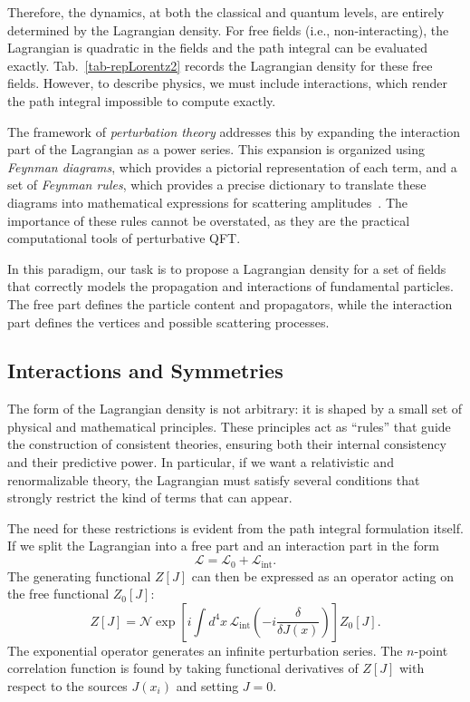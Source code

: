 Therefore, the dynamics, at both the classical and quantum levels, are entirely determined by the Lagrangian density. For free fields (i.e., non-interacting), the Lagrangian is quadratic in the fields and the path integral can be evaluated exactly. Tab.~\ref{tab-repLorentz2} records the Lagrangian density for these free fields. However, to describe physics, we must include interactions, which render the path integral impossible to compute exactly.

The framework of \textit{perturbation theory} addresses this by expanding the interaction part of the Lagrangian as a power series. This expansion is organized using \textit{Feynman diagrams}, which provides a pictorial representation of each term, and a set of \textit{Feynman rules}, which provides a precise dictionary to translate these diagrams into mathematical expressions for scattering amplitudes~\parencite{peskin,Weinberg}. The importance of these rules cannot be overstated, as they are the practical computational tools of perturbative QFT.


In this paradigm, our task is to propose a Lagrangian density for a set of fields that correctly models the propagation and interactions of fundamental particles. The free part defines the particle content and propagators, while the interaction part defines the vertices and possible scattering processes.

\subsection{Interactions and Symmetries} 
The form of the Lagrangian density is not arbitrary: it is shaped by a small set of physical and mathematical principles. These principles act as ``rules'' that guide the construction of consistent theories, ensuring both their internal consistency and their predictive power. In particular, if we want a relativistic and renormalizable theory, the Lagrangian must satisfy several conditions that strongly restrict the kind of terms that can appear.

The need for these restrictions is evident from the path integral formulation itself. If we split the Lagrangian into a free part and an interaction part in the form
\begin{equation}
    \mathcal{L} = \mathcal{L}_0 + \mathcal{L}_{\text{int}}.
\end{equation}
The generating functional $Z[J]$ can then be expressed as an operator acting on the free functional $Z_0[J]$:
\begin{equation}
    Z[J] = \mathcal{N} \exp\left[i \int d^4x\, \mathcal{L}_{\text{int}}\left(-i \frac{\delta}{\delta J(x)}\right)\right] Z_0[J].
\end{equation}
The exponential operator generates an infinite perturbation series. The $n$-point correlation function is found by taking functional derivatives of $Z[J]$ with respect to the sources $J(x_i)$ and setting $J=0$.

